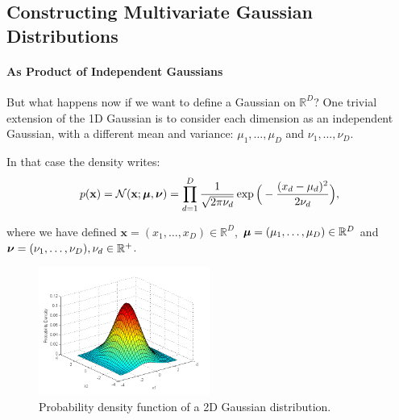 \subsection{Constructing Multivariate Gaussian Distributions}

\paragraph{As Product of Independent Gaussians} But what happens now if we want to define a Gaussian on $\mathbb{R}^D$? One trivial extension of the 1D Gaussian is to consider each dimension as an independent Gaussian, with a different mean and variance: $\mu_1,\ldots,\mu_D$ and $\nu_1,\ldots,\nu_D$.
 
In that case the density writes:
\begin{equation}
p(\mathbf{x}) = \mathcal{N}(\mathbf{x};\boldsymbol{\mathbf{\mu}},\boldsymbol{\mathbf{\nu}}) = \prod_{d=1}^D\frac{1}{\sqrt{2\pi\nu_d}}\exp\Big(-\frac{(x_d-\mu_d)^2}{2\nu_d}\Big),
\end{equation}

where we have defined $\mathbf{x}=(x_1,\ldots,x_D)\in\mathbb{R}^D$, $\boldsymbol{\mathbf{\mu}}=(\mu_1,\ldots,\mu_D)\in\mathbb{R}^D$ and $\boldsymbol{\mathbf{\nu}}=(\nu_1,\ldots,\nu_D), \nu_d\in\mathbb{R}^{+}$.

\begin{figure}[H]
 \centering
 \includegraphics[width=0.5\textwidth]{fig/multivariate_gaussian}
 \caption{Probability density function of a 2D Gaussian distribution.}
 \label{fig:pdf-2d-Gaussian}
\end{figure}


